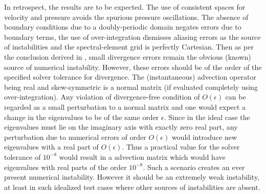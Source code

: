 In retrospect, the results are to be expected. The use of consistent spaces for velocity and pressure avoids the spurious pressure oscillations. The absence of boundary conditions due to a doubly-periodic domain negates errors due to boundary terms, the use of over-integration dismisses aliasing errors as the source of instabilities and the spectral-element grid is perfectly Cartesian. Then as per the conclusion derived in \cite{malm13}, small divergence errors remain the obvious (known) source of numerical instability. However, these errors should be of the order of the specified solver tolerance for divergence. The (instantaneous) advection operator being real and skew-symmetric is a normal matrix (if evaluated completely using over-integration). Any violation of divergence-free condition of $O(\epsilon)$ can be regarded as a small perturbation to a normal matrix and one would expect a change in the eigenvalues to be of the same order $\epsilon$. Since in the ideal case the eigenvalues must lie on the imaginary axis with exactly zero real part, any perturbation due to numerical errors of order $O(\epsilon)$ would introduce new eigenvalues with a real part of $O(\epsilon)$. Thus a practical value for the solver tolerance of $10^{-8}$ would result in a advection matrix which would have eigenvalues with real parts of the order $10^{-8}$. Such a scenario creates an ever present numerical instability. However it should be an extremely weak instability, at least in such idealized test cases where other sources of instabilities are absent.

